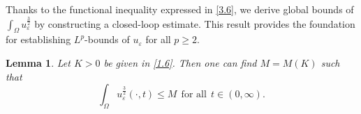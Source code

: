 \documentclass[12pt]{article}
\theoremstyle{plain}
\newtheorem{lemma}{Lemma}[section]
\theoremstyle{definition}
\numberwithin{equation}{section}
\begin{document}
    Thanks to the functional inequality expressed in \eqref{3.6}, we derive  global bounds of $\int_\Omega u_\varepsilon^{\frac{3}{2}}$
by constructing a closed-loop estimate.
 This result provides the foundation for establishing $L^p$-bounds of $u_\varepsilon$ for all $p\geq2$.
\begin{lemma}\label{lemma3.5}
 Let $K>0$ be given  in \eqref{1.6}. Then one can find $M=M(K)$ such that
    \begin{equation}\label{3.7}
        \int_\Omega u_\varepsilon^{\frac{3}{2}}(\cdot,t)\leq M~~\mbox{for all}~~t\in(0,\infty).
        \end{equation}
\end{lemma}
\end{document}
